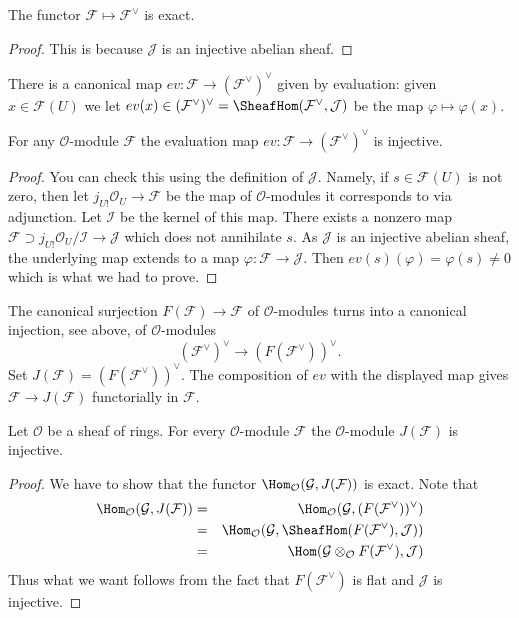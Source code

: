 \begin{lemma}
\label{lemma-vee-exact-sheaves}
The functor $\mathcal{F} \mapsto \mathcal{F}^\vee$ is exact.
\end{lemma}

\begin{proof}
This is because $\mathcal{J}$ is an injective abelian sheaf.
\end{proof}

\noindent
There is a canonical map $ev : \mathcal{F} \to (\mathcal{F}^\vee)^\vee$
given by evaluation: given $x \in \mathcal{F}(U)$ we let
$ev(x) \in (\mathcal{F}^\vee)^\vee =
\SheafHom(\mathcal{F}^\vee, \mathcal{J})$
be the map $\varphi \mapsto \varphi(x)$.

\begin{lemma}
\label{lemma-ev-injective-sheaves}
For any $\mathcal{O}$-module $\mathcal{F}$ the evaluation map
$ev : \mathcal{F} \to (\mathcal{F}^\vee)^\vee$ is injective.
\end{lemma}

\begin{proof}
You can check this using the definition of $\mathcal{J}$.
Namely, if $s \in \mathcal{F}(U)$ is not zero, then let
$j_{U!}\mathcal{O}_U \to \mathcal{F}$ be the map of
$\mathcal{O}$-modules it corresponds to via adjunction.
Let $\mathcal{I}$ be the kernel of this map. There exists
a nonzero map $\mathcal{F} \supset j_{U!}\mathcal{O}_U/\mathcal{I}
\to \mathcal{J}$ which does not annihilate $s$. As $\mathcal{J}$ is
an injective abelian sheaf, the underlying map extends to a map
$\varphi : \mathcal{F} \to \mathcal{J}$.
Then $ev(s)(\varphi) = \varphi(s) \not = 0$ which is what we had to prove.
\end{proof}

\noindent
The canonical surjection
$F(\mathcal{F}) \to \mathcal{F}$ of $\mathcal{O}$-modules turns into a
canonical injection, see above, of $\mathcal{O}$-modules
$$
(\mathcal{F}^\vee)^\vee \longrightarrow (F(\mathcal{F}^\vee))^\vee.
$$
Set $J(\mathcal{F}) = (F(\mathcal{F}^\vee))^\vee$.
The composition of $ev$ with the displayed
map gives
$\mathcal{F} \to J(\mathcal{F})$ functorially in $\mathcal{F}$.

\begin{lemma}
\label{lemma-JM-injective-sheaves}
Let $\mathcal{O}$ be a sheaf of rings.
For every $\mathcal{O}$-module $\mathcal{F}$ the
$\mathcal{O}$-module $J(\mathcal{F})$ is injective.
\end{lemma}

\begin{proof}
We have to show that the functor
$\Hom_\mathcal{O}(\mathcal{G}, J(\mathcal{F}))$
is exact. Note that
\begin{eqnarray*}
\Hom_\mathcal{O}(\mathcal{G}, J(\mathcal{F}))
& = &
\Hom_\mathcal{O}(\mathcal{G}, (F(\mathcal{F}^\vee))^\vee) \\
& = &
\Hom_\mathcal{O}
(\mathcal{G}, \SheafHom(F(\mathcal{F}^\vee), \mathcal{J})) \\
& = &
\Hom(\mathcal{G} \otimes_\mathcal{O} F(\mathcal{F}^\vee), \mathcal{J})
\end{eqnarray*}
Thus what we want follows from the fact that $F(\mathcal{F}^\vee)$
is flat and $\mathcal{J}$ is injective.
\end{proof}

